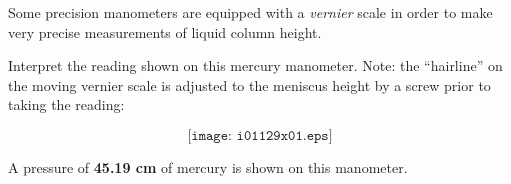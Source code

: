 

Some precision manometers are equipped with a {\it vernier} scale in order to make very precise measurements of liquid column height.

\vskip 10pt

Interpret the reading shown on this mercury manometer.  Note: the ``hairline'' on the moving vernier scale is adjusted to the meniscus height by a screw prior to taking the reading:

$$\texttt{[image: i01129x01.eps]}$$







A pressure of {\bf 45.19 cm} of mercury is shown on this manometer.
 










